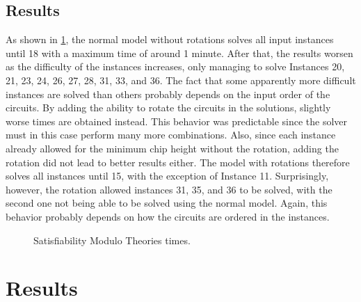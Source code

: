 \documentclass[a4paper, 12pt]{article}
\begin{document}
\subsection{Results}

As shown in \cref{fig:smt}, the normal model without rotations solves all input instances until 18 with a maximum time of around 1 minute. After that, the results worsen as the difficulty of the instances increases, only managing to solve Instances 20, 21, 23, 24, 26, 27, 28, 31, 33, and 36. The fact that some apparently more difficult instances are solved than others probably depends on the input order of the circuits. By adding the ability to rotate the circuits in the solutions, slightly worse times are obtained instead. This behavior was predictable since the solver must in this case perform many more combinations. Also, since each instance already allowed for the minimum chip height without the rotation, adding the rotation did not lead to better results either. The model with rotations therefore solves all instances until 15, with the exception of Instance 11. Surprisingly, however, the rotation allowed instances 31, 35, and 36 to be solved, with the second one not being able to be solved using the normal model. Again, this behavior probably depends on how the circuits are ordered in the instances.

\begin{figure}
    \centering
    \caption{Satisfiability Modulo Theories times.}
    \label{fig:smt}
\end{figure}


\clearpage


\section{Results}
\end{document}
